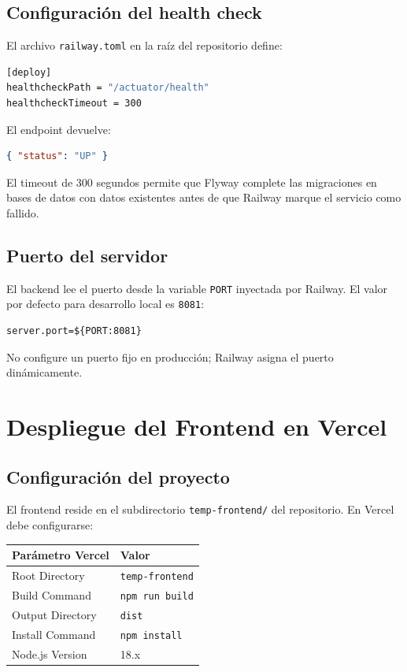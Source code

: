 \documentclass[11pt, a4paper]{article}
\begin{document}
\subsection{Configuración del health check}

El archivo \texttt{railway.toml} en la raíz del repositorio define:

\begin{lstlisting}[language=bash]
[deploy]
healthcheckPath = "/actuator/health"
healthcheckTimeout = 300
\end{lstlisting}

El endpoint devuelve:
\begin{lstlisting}[language=json]
{ "status": "UP" }
\end{lstlisting}

El timeout de 300 segundos permite que Flyway complete las migraciones en bases de datos con datos existentes antes de que Railway marque el servicio como fallido.

\subsection{Puerto del servidor}

El backend lee el puerto desde la variable \texttt{PORT} inyectada por Railway. El valor por defecto para desarrollo local es \texttt{8081}:

\begin{lstlisting}
server.port=${PORT:8081}
\end{lstlisting}

No configure un puerto fijo en producción; Railway asigna el puerto dinámicamente.

\section{Despliegue del Frontend en Vercel}

\subsection{Configuración del proyecto}

El frontend reside en el subdirectorio \texttt{temp-frontend/} del repositorio. En Vercel debe configurarse:

\begin{center}
\begin{tabular}{L{4.5cm} L{8cm}}
\toprule
\textbf{Parámetro Vercel} & \textbf{Valor} \\
\midrule
Root Directory      & \texttt{temp-frontend} \\
Build Command       & \texttt{npm run build} \\
Output Directory    & \texttt{dist} \\
Install Command     & \texttt{npm install} \\
Node.js Version     & 18.x \\
\bottomrule
\end{tabular}
\end{center}
\end{document}
